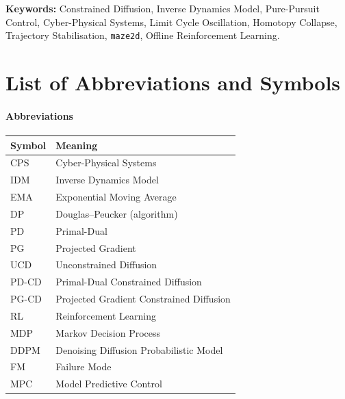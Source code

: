 \documentclass[12pt, a4paper, oneside]{report}
\theoremstyle{definition}
\begin{document}
\vspace{0.6em}
\noindent\textbf{Keywords:} Constrained Diffusion, Inverse Dynamics
Model, Pure-Pursuit Control, Cyber-Physical Systems,
Limit Cycle Oscillation, Homotopy Collapse, Trajectory Stabilisation,
\texttt{maze2d}, Offline Reinforcement Learning.

\cleardoublepage

\tableofcontents
\cleardoublepage
\listoffigures
\cleardoublepage
\listoftables
\cleardoublepage

\chapter*{List of Abbreviations and Symbols}

\subsubsection*{Abbreviations}
\begin{center}
\begin{tabularx}{0.85\linewidth}{@{}lX@{}}
  \toprule
  \textbf{Symbol} & \textbf{Meaning} \\
  \midrule
  CPS    & Cyber-Physical Systems \\
  IDM    & Inverse Dynamics Model \\
  EMA    & Exponential Moving Average \\
  DP     & Douglas--Peucker (algorithm) \\
  PD     & Primal-Dual \\
  PG     & Projected Gradient \\
  UCD    & Unconstrained Diffusion \\
  PD-CD  & Primal-Dual Constrained Diffusion \\
  PG-CD  & Projected Gradient Constrained Diffusion \\
  RL     & Reinforcement Learning \\
  MDP    & Markov Decision Process \\
  DDPM   & Denoising Diffusion Probabilistic Model \\
  FM     & Failure Mode \\
  MPC    & Model Predictive Control \\
  \bottomrule
\end{tabularx}
\end{center}
\end{document}
